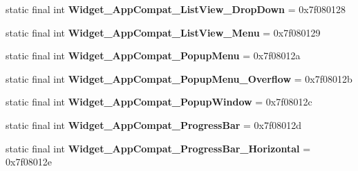\begin{DoxyCompactItemize}
\item 
\hypertarget{classandroid_1_1support_1_1v7_1_1appcompat_1_1_r_1_1style_afae0a0c13593ec0b5f020075de5706a0}{}static final int {\bfseries Widget\+\_\+\+App\+Compat\+\_\+\+List\+View\+\_\+\+Drop\+Down} = 0x7f080128\label{classandroid_1_1support_1_1v7_1_1appcompat_1_1_r_1_1style_afae0a0c13593ec0b5f020075de5706a0}

\item 
\hypertarget{classandroid_1_1support_1_1v7_1_1appcompat_1_1_r_1_1style_a4323c3c0ee6ee31e74863ada981eeeb5}{}static final int {\bfseries Widget\+\_\+\+App\+Compat\+\_\+\+List\+View\+\_\+\+Menu} = 0x7f080129\label{classandroid_1_1support_1_1v7_1_1appcompat_1_1_r_1_1style_a4323c3c0ee6ee31e74863ada981eeeb5}

\item 
\hypertarget{classandroid_1_1support_1_1v7_1_1appcompat_1_1_r_1_1style_ad3c806ce88489c9b3ef74ba1395ced31}{}static final int {\bfseries Widget\+\_\+\+App\+Compat\+\_\+\+Popup\+Menu} = 0x7f08012a\label{classandroid_1_1support_1_1v7_1_1appcompat_1_1_r_1_1style_ad3c806ce88489c9b3ef74ba1395ced31}

\item 
\hypertarget{classandroid_1_1support_1_1v7_1_1appcompat_1_1_r_1_1style_a16c6dbc6371fa5e4d0cf07f332d50896}{}static final int {\bfseries Widget\+\_\+\+App\+Compat\+\_\+\+Popup\+Menu\+\_\+\+Overflow} = 0x7f08012b\label{classandroid_1_1support_1_1v7_1_1appcompat_1_1_r_1_1style_a16c6dbc6371fa5e4d0cf07f332d50896}

\item 
\hypertarget{classandroid_1_1support_1_1v7_1_1appcompat_1_1_r_1_1style_a33aca1a50cb4c38c4446ba6812d92650}{}static final int {\bfseries Widget\+\_\+\+App\+Compat\+\_\+\+Popup\+Window} = 0x7f08012c\label{classandroid_1_1support_1_1v7_1_1appcompat_1_1_r_1_1style_a33aca1a50cb4c38c4446ba6812d92650}

\item 
\hypertarget{classandroid_1_1support_1_1v7_1_1appcompat_1_1_r_1_1style_ab390a7d95b35ab9e44076a85e154b7f3}{}static final int {\bfseries Widget\+\_\+\+App\+Compat\+\_\+\+Progress\+Bar} = 0x7f08012d\label{classandroid_1_1support_1_1v7_1_1appcompat_1_1_r_1_1style_ab390a7d95b35ab9e44076a85e154b7f3}

\item 
\hypertarget{classandroid_1_1support_1_1v7_1_1appcompat_1_1_r_1_1style_a2199021cd967c56ad7d210cf7f9b7954}{}static final int {\bfseries Widget\+\_\+\+App\+Compat\+\_\+\+Progress\+Bar\+\_\+\+Horizontal} = 0x7f08012e\label{classandroid_1_1support_1_1v7_1_1appcompat_1_1_r_1_1style_a2199021cd967c56ad7d210cf7f9b7954}


\end{DoxyCompactItemize}
